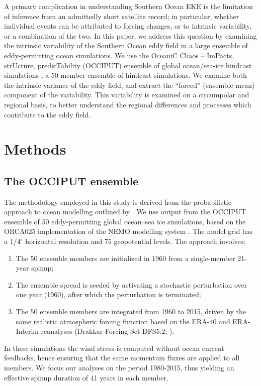 \documentclass[linenumbers]{agujournal2019}
\begin{document}
A primary complication in understanding Southern Ocean EKE is the limitation of inference from an admittedly short satellite record; in particular, whether individual events can be attributed to forcing changes, or to intrinsic variability, or a combination of the two.
In this paper, we address this question by examining the intrinsic variability of the Southern Ocean eddy field in a large ensemble of eddy-permitting ocean simulations.
We use the OceaniC Chaos – ImPacts, strUcture, predicTability (OCCIPUT) ensemble of global ocean/sea-ice hindcast simulations \citep{Penduff-etal-2014, Leroux2018}, a 50-member ensemble of hindcast simulations.
We examine both the intrinsic variance of the eddy field, and extract the ``forced'' (ensemble mean) component of the variability.
This variability is examined on a circumpolar and regional basis, to better understand the regional differences and processes which contribute to the eddy field.



\section{Methods}

\subsection{The OCCIPUT ensemble}

The methodology employed in this study is derived from the probabilistic approach to ocean modelling outlined by \citet{Bessieres2017}.
We use output from the OCCIPUT ensemble of 50 eddy-permitting global ocean--sea ice simulations, based on the ORCA025 implementation \citep[e.g.][]{Barnier2006} of the NEMO modelling system \citep{Madec2012}. 
The model grid has a 1/4$^\circ$ horizontal resolution and 75 geopotential levels. 
The approach involves:
\begin{enumerate}
\item The 50 ensemble members are initialized in 1960 from a single-member 21-year spinup;
\item The ensemble spread is seeded by activating a stochastic perturbation \citep{Brankart-etal-2015} over one year (1960), after which the perturbation is terminated;
\item The 50 ensemble members are integrated from 1960 to 2015, driven by the same realistic atmospheric forcing function based on the ERA-40 and ERA-Interim reanalyses (Drakkar Forcing Set DFS5.2; \citet{Dussin-etal-2016}).
\end{enumerate}
In these simulations the wind stress is computed without ocean current feedbacks, hence ensuring that the same momentum fluxes are applied to all members. 
We focus our analyses on the period 1980-2015, thus yielding an effective spinup duration of 41 years in each member. 
\end{document}
